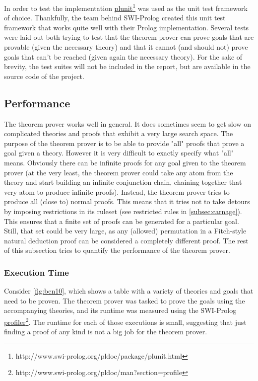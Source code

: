 \documentclass[11pt,twoside,a4paper]{report}
\begin{document}
In order to test the implementation \href{http://www.swi-prolog.org/pldoc/package/plunit.html}{plunit}\footnote{http://www.swi-prolog.org/pldoc/package/plunit.html} was used as the unit test framework of choice. Thankfully, the team behind SWI-Prolog created this unit test framework that works quite well with their Prolog implementation. Several tests were laid out both trying to test that the theorem prover can prove goals that are provable (given the necessary theory) and that it cannot (and should not) prove goals that can't be reached (given again the necessary theory). For the sake of brevity, the test suites will not be included in the report, but are available in the source code of the project.

\subsection{Performance}
The theorem prover works well in general. It does sometimes seem to get slow on complicated theories and proofs that exhibit a very large search space. The purpose of the theorem prover is to be able to provide "all" proofs that prove a goal given a theory. However it is very difficult to exactly specify what "all" means. Obviously there can be infinite proofs for any goal given to the theorem prover (at the very least, the theorem prover could take any atom from the theory and start building an infinite conjunction chain, chaining together that very atom to produce infinite proofs). Instead, the theorem prover tries to produce all (close to) normal proofs. This means that it tries not to take detours by imposing restrictions in its ruleset (see restricted rules in \autoref{subsec:carnage}). This ensures that a finite set of proofs can be generated for a particular goal. Still, that set could be very large, as any (allowed) permutation in a Fitch-style natural deduction proof can be considered a completely different proof. The rest of this subsection tries to quantify the performance of the theorem prover.

\subsubsection{Execution Time}
Consider \autoref{fig:ben10}, which shows a table with a variety of theories and goals that need to be proven. The theorem prover was tasked to prove the goals using the accompanying theories, and its runtime was measured using the SWI-Prolog \href{http://www.swi-prolog.org/pldoc/man?section=profile}{profiler}\footnote{http://www.swi-prolog.org/pldoc/man?section=profile}. The runtime for each of those executions is small, suggesting that just finding a proof of any kind is not a big job for the theorem prover.
\end{document}
